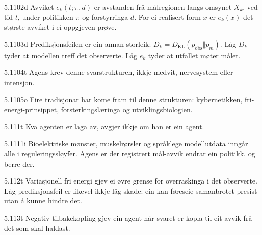 \begin{formproposition}{5.1102}{d}
Avviket \(e_k(t;\pi,d)\) er avstanden frå målregionen langs omsynet \(X_k\), ved tid \(t\), under politikken \(\pi\) og forstyrringa \(d\). For ei realisert form \(x\) er \(e_k(x)\) det største avviket i ei oppgjeven prøve.
\end{formproposition}

\begin{formproposition}{5.1103}{d}
Prediksjonsfeilen er ein annan storleik: \(D_k=D_{\mathrm{KL}}(p_{\mathrm{obs}}\Vert p_m)\). Låg \(D_k\) tyder at modellen treff det observerte. Låg \(e_k\) tyder at utfallet møter målet.
\end{formproposition}

\begin{formproposition}{5.1104}{t}
Agens krev denne svarstrukturen, ikkje medvit, nervesystem eller intensjon.
\end{formproposition}

\begin{formproposition}{5.1105}{o}
Fire tradisjonar har kome fram til denne strukturen: kybernetikken, fri-energi-prinsippet, forsterkingslæringa og utviklingsbiologien.
\end{formproposition}

\begin{formproposition}{5.111}{t}
Kva agenten er laga av, avgjer ikkje om han er ein agent.
\end{formproposition}

\begin{formproposition}{5.1111}{i}
Bioelektriske mønster, muskelrørsler og språklege modellutdata inngår alle i reguleringssløyfer. Agens er der registrert mål-avvik endrar ein politikk, og berre der.
\end{formproposition}

\begin{formproposition}{5.112}{t}
Variasjonell fri energi gjev ei øvre grense for overraskinga i det observerte. Låg prediksjonsfeil er likevel ikkje låg skade: ein kan føreseie samanbrotet presist utan å kunne hindre det.
\end{formproposition}

\begin{formproposition}{5.113}{t}
Negativ tilbakekopling gjev ein agent når svaret er kopla til eit avvik frå det som skal haldast.
\end{formproposition}

